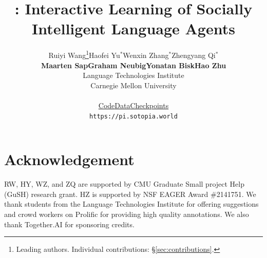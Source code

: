 \documentclass[11pt]{article}
\title{\Model: Interactive Learning of Socially Intelligent Language Agents}
\author{Ruiyi Wang\thanks{Leading authors. Individual contributions: \S\ref{sec:contributions}.}\quad Haofei Yu$^*$\quad Wenxin Zhang$^*$\quad Zhengyang Qi$^*$ 
\\
\textbf{Maarten Sap\quad Graham Neubig\quad Yonatan Bisk\quad Hao Zhu}\\
  Language Technologies Institute \\
  Carnegie Mellon University \\
  \\
  \href{https://github.com/sotopia-lab/sotopia-pi}
  {Code}\quad \href{https://huggingface.co/datasets/cmu-lti/sotopia-pi}{Data}\quad\href{https://huggingface.co/cmu-lti/sotopia-pi-mistral-7b-BC_SR}{Checkpoints}\\
  \texttt{https://pi.sotopia.world} \\}
\newcommand{\hao}[1]{\todo[color=violet!30,size=tiny]{HZ: #1}}
\begin{document}
\maketitle










\section*{Acknowledgement}
RW, HY, WZ, and ZQ are supported by CMU Graduate Small project Help (GuSH) research grant. HZ is supported by NSF EAGER Award \#2141751. We thank students from the Language Technologies Institute for offering suggestions and crowd workers on Prolific for providing high quality annotations. We also thank Together.AI for sponsoring credits.



%


\appendix


\end{document}
